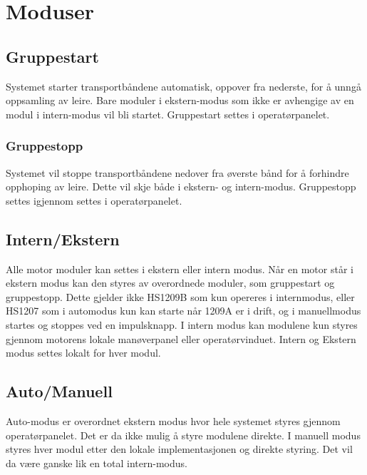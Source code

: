 \section{Moduser}
\subsection{Gruppestart}
	Systemet starter transportbåndene automatisk, oppover fra nederste, for å unngå oppsamling av leire. Bare moduler i ekstern-modus som ikke er avhengige av en modul i intern-modus vil bli startet. Gruppestart settes i operatørpanelet.
\subsubsection{Gruppestopp}
	Systemet vil stoppe transportbåndene nedover fra øverste bånd for å forhindre opphoping av leire. Dette vil skje både i ekstern- og intern-modus. Gruppestopp settes igjennom settes i operatørpanelet.
\subsection{Intern/Ekstern}
	Alle motor moduler kan settes i ekstern eller intern modus. Når en motor står i ekstern modus kan den styres av overordnede moduler, som gruppestart og gruppestopp. Dette gjelder ikke HS1209B som kun opereres i internmodus, eller HS1207 som i automodus kun kan starte når 1209A er i drift, og i manuellmodus startes og stoppes ved en impulsknapp. I intern modus kan modulene kun styres gjennom motorens lokale manøverpanel eller operatørvinduet. Intern og Ekstern modus settes lokalt for hver modul.
\subsection{Auto/Manuell}
	Auto-modus er overordnet ekstern modus hvor hele systemet styres gjennom operatørpanelet. Det er da ikke mulig å styre modulene direkte.
	I manuell modus styres hver modul etter den lokale implementasjonen og direkte styring. Det vil da være ganske lik en total intern-modus.